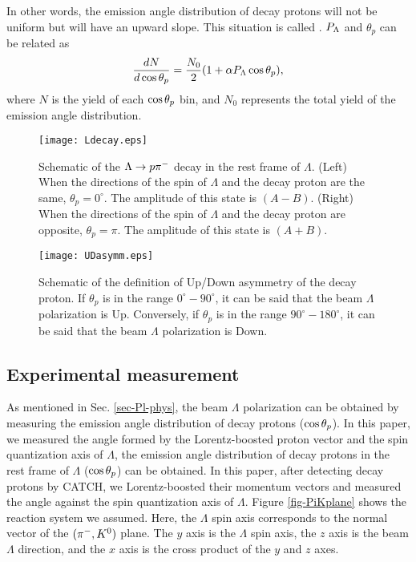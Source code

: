In other words, the emission angle distribution of decay protons will not be uniform but will have an upward slope. This situation is called . $P_{\Lambda}$ and $\theta_{p}$ can be related as 
\begin{equation}
  \frac{dN}{d\cos{\theta_p}} = \frac{N_0}{2}(1+\alpha P_{\Lambda}\cos{\theta_p}), 
  \label{eq-costp}
\end{equation}
where $N$ is the yield of each $\cos{\theta_p}$ bin, and $N_0$ represents the total yield of the emission angle distribution. %

\begin{figure}[h]
  \centering
  \texttt{[image: Ldecay.eps]}
  \caption{Schematic of the $\Lambda\to p\pi^{-}$ decay in the rest frame of $\Lambda$. (Left) When the directions of the spin of $\Lambda$ and the decay proton are the same, $\theta_{p}=0^{\circ}$. The amplitude of this state is $(A-B)$. (Right) When the directions of the spin of $\Lambda$ and the decay proton are opposite, $\theta_{p}=\pi$. The amplitude of this state is $(A+B)$.}
  \label{fig-Ldecay}
\end{figure}

\begin{figure}[h]
  \centering
  \texttt{[image: UDasymm.eps]}
  \caption{Schematic of the definition of Up/Down asymmetry of the decay proton. If $\theta_{p}$ is in the range $0^{\circ}-90^{\circ}$, it can be said that the beam $\Lambda$ polarization is Up. Conversely, if $\theta_{p}$ is in the range $90^{\circ}-180^{\circ}$, it can be said that the beam $\Lambda$ polarization is Down.}
  \label{fig-UDasymm}
\end{figure}


\subsection{Experimental measurement}

As mentioned in Sec. \ref{sec-Pl-phys}, the beam $\Lambda$ polarization can be obtained by measuring the emission angle distribution of decay protons ($\cos{\theta_p}$). In this paper, we measured the angle formed by the Lorentz-boosted proton vector and the spin quantization axis of $\Lambda$, the emission angle distribution of decay protons in the rest frame of $\Lambda$ ($\cos{\theta_p}$) can be obtained. In this paper, after detecting decay protons by CATCH, we Lorentz-boosted their momentum vectors and measured the angle against the spin quantization axis of $\Lambda$. Figure \ref{fig-PiKplane} shows the reaction system we assumed. Here, the $\Lambda$ spin axis corresponds to the normal vector of the $(\pi^-,K^0)$ plane. The $y$ axis is the $\Lambda$ spin axis, the $z$ axis is the beam $\Lambda$ direction, and the $x$ axis is the cross product of the $y$ and $z$ axes. 

